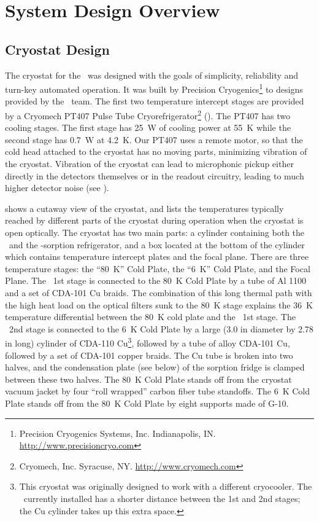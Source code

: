 \chapter{System Design Overview}\label{c:sys-design}

\section{Cryostat Design}\label{sec:ch4-cryo-design}

The cryostat for the \Imager\ was designed with the goals of simplicity, reliability and turn-key automated operation.
It was built by Precision Cryogenics\footnote{Precision Cryogenics Systems, Inc. Indianapolis, IN. \url{http://www.precisioncryo.com}} to designs provided by the \Imager\ team.
The first two temperature intercept stages are provided by a Cryomech PT407 Pulse Tube Cryorefrigerator\footnote{Cryomech, Inc. Syracuse, NY. \url{http://www.cryomech.com}} (\PTC).
The PT407 has two cooling stages.
The first stage has \SI{25}{\W} of cooling power at \SI{55}{\K} while the second stage has \SI{0.7}{\W} at \SI{4.2}{\K}.
Our PT407 uses a remote motor, so that the cold head attached to the cryostat has no moving parts, minimizing vibration of the cryostat.
Vibration of the cryostat can lead to microphonic pickup either directly in the detectors themselves or in the readout circuitry, leading to much higher detector noise (see ).

 shows a cutaway view of the cryostat, and  lists the temperatures typically reached by different parts of the cryostat during operation when the cryostat is open optically.
The cryostat has two main parts: a cylinder containing both the \PTC\ and the -sorption refrigerator, and a box located at the bottom of the cylinder which contains temperature intercept plates and the focal plane.
There are three temperature stages: the ``\SI{80}{\K}'' Cold Plate, the ``\SI{6}{\K}'' Cold Plate, and the Focal Plane.
The \PTC\ 1st stage is connected to the \SI{80}{\K} Cold Plate by a tube of Al 1100 and a set of CDA-101 Cu braids.
The combination of this long thermal path with the high heat load on the optical filters sunk to the \SI{80}{\K} stage explains the \SI{36}{\K} temperature differential between the \SI{80}{\K} cold plate and the \PTC\ 1st stage.
The \PTC\ 2nd stage is connected to the \SI{6}{K} Cold Plate by a large (3.0 in diameter by 2.78 in long) cylinder of CDA-110 Cu\footnote{This cryostat was originally designed to work with a different cryocooler. The \PTC\ currently installed has a shorter distance between the 1st and 2nd stages; the Cu cylinder takes up this extra space.}, followed by a tube of alloy CDA-101 Cu, followed by a set of  CDA-101 copper braids.
The Cu tube is broken into two halves, and the condensation plate (see below) of the sorption fridge is clamped between these two halves.
The \SI{80}{\K} Cold Plate stands off from the cryostat vacuum jacket by four ``roll wrapped'' carbon fiber tube standoffs.
The \SI{6}{\K} Cold Plate stands off from the \SI{80}{\K} Cold Plate by eight supports made of G-10.

